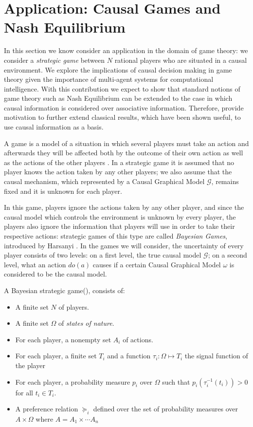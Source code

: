 \documentclass{svjour3}                     %
\begin{document}
\section{Application: Causal Games and Nash Equilibrium}
\label{causal_games}
In this section we know consider an application in the domain of game theory: we consider a \textit{strategic game} between $N$ rational players who are situated in a causal environment. We explore the implications of causal decision making in game theory given the importance of multi-agent systems for computational intelligence. With this contribution we expect to show that standard notions of game theory such as Nash Equilibrium can be extended to the case in which causal information is considered over associative information. Therefore, provide motivation to further extend classical results, which have been shown useful, to use causal information as a basis.

A game is a model of a situation in which several players must take an action and afterwards they will be affected both by the outcome of their own action as well as the actions of the other players \citep{osborne1994course}. In a strategic game it is assumed that no player knows the action taken by any other players; we also assume that the causal mechanism, which represented by a Causal Graphical Model $\mathcal{G}$, remains fixed and it is unknown for each player. 

In this game, players ignore the actions taken by any other player, and since the causal model which controls the environment is unknown by every player, the players also ignore the information that players will use in order to take their respective actions: strategic games of this type are called \textit{Bayesian Games}, introduced by Harsanyi \citep{harsanyi1967games1,harsanyi1968games2,harsanyi1968games3}. In the games we will consider, the uncertainty of every player consists of two levels: on a first level, the true causal model $\mathcal{G}$; on a second level, what an action $do(a)$ causes if a certain Causal Graphical Model $\omega$ is considered to be the causal model. 
\begin{definition}
A Bayesian strategic game(\cite{osborne1994course}), consists of:
\begin{itemize}
\item A finite set $N$ of players.
\item A finite set $\Omega$ of \textit{states of nature}.
\item For each player, a nonempty set $A_i$ of actions.
\item For each player, a finite set $T_i$ and a function $\tau_i : \Omega \mapsto T_i$ the signal function of the player
\item For each player, a probability measure $p_i$ over $\Omega$ such that $p_i (\tau^{-1}_i (t_i))>0$ for all $t_i \in T_i$.
\item A preference relation $\succeq_i$ defined over the set of probability measures over $A \times \Omega$ where $A= A_1 \times \cdots A_n$
\end{itemize}
\end{definition}
\end{document}
